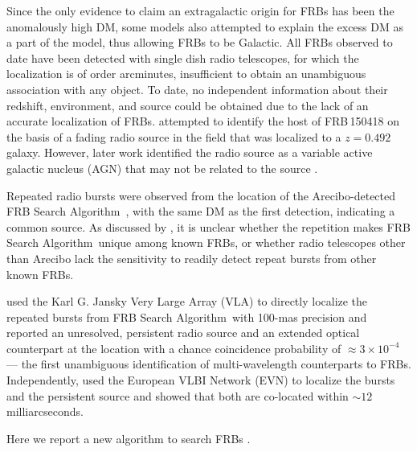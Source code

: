 \documentclass[twocolumn]{aastex61}
\def \frb {FRB Search Algorithm}
\begin{document}
Since the only evidence to claim an extragalactic origin for FRBs has been the anomalously high DM, some models also attempted to explain the excess DM as a part of the model, thus allowing FRBs to be Galactic. All FRBs observed to date have been detected with single dish radio telescopes, for which the localization is of order arcminutes, insufficient to obtain an unambiguous association with any object. To date, no independent information about their redshift, environment, and source could be obtained due to the lack of an accurate localization of FRBs. \citet{kjb+16} attempted to identify the host of FRB\,150418 on the basis of a fading radio source in the field that was localized to a $z=0.492$ galaxy. However, later work identified the radio source as a variable active galactic nucleus (AGN) that may not be related to the source \citep{wb16,bbt+16,gmg+16,jkb+16}.

 Repeated radio bursts were observed from the location of the Arecibo-detected \frb\ \citep{ssh+16a,ssh+16b}, with the same DM as the first detection, indicating a common source. As discussed by \citet{ssh+16a}, it is unclear whether the repetition makes \frb\ unique among known FRBs, or whether radio telescopes other than Arecibo lack the sensitivity to readily detect repeat bursts from other known FRBs.

\citet{clw+16} used the Karl G. Jansky Very Large Array (VLA) to directly localize the repeated bursts from \frb\ with 100-mas precision and reported an unresolved, persistent radio source and an extended optical counterpart at the location with a chance coincidence probability of $\approx 3\times10^{-4}$ --- the first unambiguous identification of multi-wavelength counterparts to FRBs. Independently, \citet{mph+16} used the European VLBI Network (EVN) to localize the bursts and the persistent source and showed that both are co-located within $\sim12$ milliarcseconds.

Here we report a new algorithm to search FRBs . 

\end{document}
